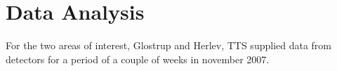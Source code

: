 \section{Data Analysis}
For the two areas of interest, Glostrup and Herlev, TTS supplied data from detectors for a period of a couple of weeks in november 2007.

